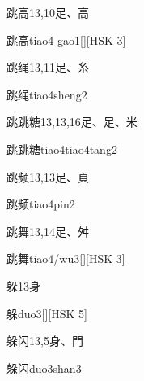 \begin{Entry}{跳高}{13,10}{⾜、⾼}
  \begin{Phonetics}{跳高}{tiao4 gao1}[][HSK 3]
  \end{Phonetics}
\end{Entry}

\begin{Entry}{跳绳}{13,11}{⾜、⽷}
  \begin{Phonetics}{跳绳}{tiao4sheng2}
  \end{Phonetics}
\end{Entry}

\begin{Entry}{跳跳糖}{13,13,16}{⾜、⾜、⽶}
  \begin{Phonetics}{跳跳糖}{tiao4tiao4tang2}
  \end{Phonetics}
\end{Entry}

\begin{Entry}{跳频}{13,13}{⾜、⾴}
  \begin{Phonetics}{跳频}{tiao4pin2}
  \end{Phonetics}
\end{Entry}

\begin{Entry}{跳舞}{13,14}{⾜、⾇}
  \begin{Phonetics}{跳舞}{tiao4/wu3}[][HSK 3]
  \end{Phonetics}
\end{Entry}

\begin{Entry}{躲}{13}{⾝}
  \begin{Phonetics}{躲}{duo3}[][HSK 5]
  \end{Phonetics}
\end{Entry}

\begin{Entry}{躲闪}{13,5}{⾝、⾨}
  \begin{Phonetics}{躲闪}{duo3shan3}
  \end{Phonetics}
\end{Entry}

